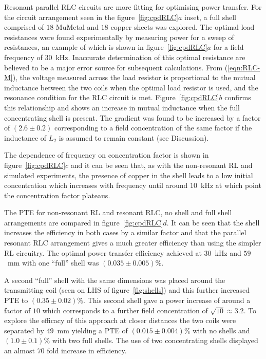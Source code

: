 \documentclass[11pt]{iopart}
\begin{document}
Resonant parallel RLC circuits are more fitting for optimising power
transfer. For the circuit arrangement seen in the
figure~\ref{fig:cpdRLC}$a$ inset, a full shell comprised of $18$
MuMetal and $18$ copper sheets was explored. The optimal load
resistances were found experimentally by measuring power for a sweep
of resistances, an example of which is shown in
figure~\ref{fig:cpdRLC}$a$ for a field frequency of
$30$~kHz. Inaccurate determination of this optimal resistance are
believed to be a major error source for subsequent calculations.  From
(\ref{eqn:RLC-M}), the voltage measured across the load resistor is
proportional to the mutual inductance between the two coils when the
optimal load resistor is used, and the resonance condition for the RLC
circuit is met. Figure~\ref{fig:cpdRLC}$b$ confirms this relationship
and shows an increase in mutual inductance when the full concentrating
shell is present. The gradient was found to be increased by a factor
of $(2.6 \pm 0.2)$ corresponding to a field concentration of the same
factor if the inductance of $L_2$ is assumed to remain constant (see
Discussion).

The dependence of frequency on concentration factor is shown in
figure~\ref{fig:cpdRLC}$c$ and it can be seen that, as with the non-resonant RL and
simulated experiments, the presence of copper in the shell leads to a
low initial concentration which increases with frequency until around
$10$~kHz at which point the concentration factor plateaus.

The PTE for non-resonant RL and resonant RLC, no shell and full shell arrangements are
compared in figure~\ref{fig:cpdRLC}$d$. It can be seen that the shell
increases the efficiency in both cases by a similar factor and that
the parallel resonant RLC arrangement gives a much greater efficiency
than using the simpler RL circuitry. The optimal power transfer
efficiency achieved at $30$~kHz and $59$~mm with one ``full'' shell was
$(0.035\pm0.005)\%$. 

A second ``full'' shell with the same dimensions was placed around the
transmitting coil (seen on LHS of figure~\ref{fig:shells}) and this further
increased PTE to $(0.35\pm0.02)\%$. This second shell gave a power
increase of around a factor of $10$ which corresponds to a further
field concentration of $\sqrt{10} \approx 3.2$. To explore the
efficacy of this approach at closer distances the two coils were
separated by $49$~mm yielding a PTE of $(0.015\pm0.004)\%$ with no
shells and $(1.0\pm0.1)\%$ with two full shells. The use of two
concentrating shells displayed an almost $70$ fold increase in
efficiency.
\end{document}
